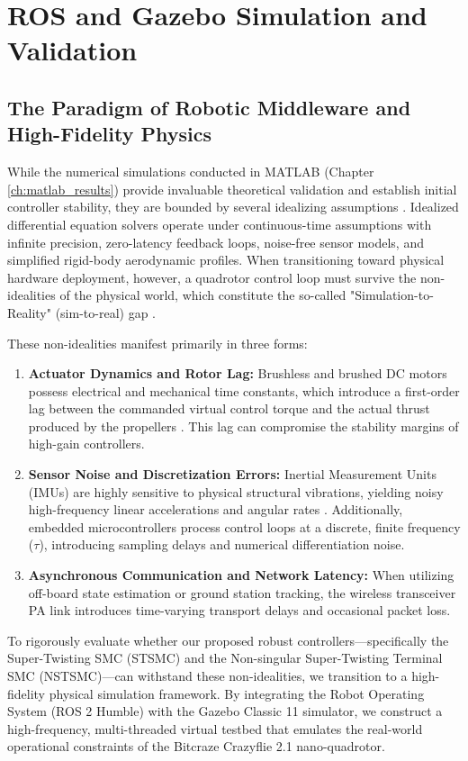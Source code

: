 \chapter{ROS and Gazebo Simulation and Validation}
\label{ch:ros_gazebo}

\section{The Paradigm of Robotic Middleware and High-Fidelity Physics}
While the numerical simulations conducted in MATLAB (Chapter \ref{ch:matlab_results}) provide invaluable theoretical validation and establish initial controller stability, they are bounded by several idealizing assumptions \cite{ref_88}. Idealized differential equation solvers operate under continuous-time assumptions with infinite precision, zero-latency feedback loops, noise-free sensor models, and simplified rigid-body aerodynamic profiles. When transitioning toward physical hardware deployment, however, a quadrotor control loop must survive the non-idealities of the physical world, which constitute the so-called "Simulation-to-Reality" (sim-to-real) gap \cite{ref_88, ref_94}. 

These non-idealities manifest primarily in three forms:
\begin{enumerate}
    \item \textbf{Actuator Dynamics and Rotor Lag:} Brushless and brushed DC motors possess electrical and mechanical time constants, which introduce a first-order lag between the commanded virtual control torque and the actual thrust produced by the propellers \cite{ref_88}. This lag can compromise the stability margins of high-gain controllers.
    \item \textbf{Sensor Noise and Discretization Errors:} Inertial Measurement Units (IMUs) are highly sensitive to physical structural vibrations, yielding noisy high-frequency linear accelerations and angular rates \cite{ref_89}. Additionally, embedded microcontrollers process control loops at a discrete, finite frequency ($\tau$), introducing sampling delays and numerical differentiation noise.
    \item \textbf{Asynchronous Communication and Network Latency:} When utilizing off-board state estimation or ground station tracking, the wireless transceiver PA link introduces time-varying transport delays and occasional packet loss.
\end{enumerate}

To rigorously evaluate whether our proposed robust controllers—specifically the Super-Twisting SMC (STSMC) and the Non-singular Super-Twisting Terminal SMC (NSTSMC)—can withstand these non-idealities, we transition to a high-fidelity physical simulation framework. By integrating the Robot Operating System (ROS 2 Humble) with the Gazebo Classic 11 simulator, we construct a high-frequency, multi-threaded virtual testbed that emulates the real-world operational constraints of the Bitcraze Crazyflie 2.1 nano-quadrotor.

